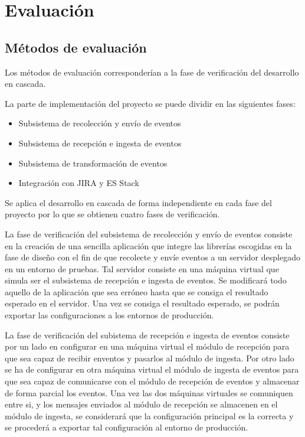 \chapter{Evaluación}
\section{Métodos de evaluación}

Los métodos de evaluación corresponderían a la fase de verificación del desarrollo en cascada.

La parte de implementación del proyecto se puede dividir en las siguientes fases:

\begin{itemize}
	\item Subsistema de recolección y envío de eventos
	\item Subsistema de recepción e ingesta de eventos
	\item Subsistema de transformación de eventos
	\item Integración con JIRA y ES Stack
\end{itemize}

Se aplica el desarrollo en cascada de forma independiente en cada fase del proyecto por lo que se obtienen cuatro fases de verificación.

La fase de verificación del subsistema de recolección y envío de eventos consiste en la creación de una sencilla aplicación que integre las librerías escogidas en la fase de diseño con el fin de que recolecte y envíe eventos a un servidor desplegado en un entorno de pruebas. Tal servidor consiste en una máquina virtual que simula ser el subsistema de recepción e ingesta de eventos. Se modificará todo aquello de la aplicación que sea erróneo hasta que se consiga el resultado esperado en el servidor. Una vez se consiga el resultado esperado, se podrán exportar las configuraciones a los entornos de producción.

La fase de verificación del subistema de recepción e ingesta de eventos consiste por un lado en configurar en una máquina virtual el módulo de recepción para que sea capaz de recibir enventos y pasarlos al módulo de ingesta. Por otro lado se ha de configurar en otra máquina virtual el módulo de ingesta de eventos para que sea capaz de comunicarse con el módulo de recepción de eventos y almacenar de forma parcial los eventos. Una vez las dos máquinas virtuales se comuniquen entre si, y los mensajes enviados al módulo de recepción se almacenen en el módulo de ingesta, se considerará que la configuración principal es la correcta y se procederá a exportar tal configuración al entorno de producción.

